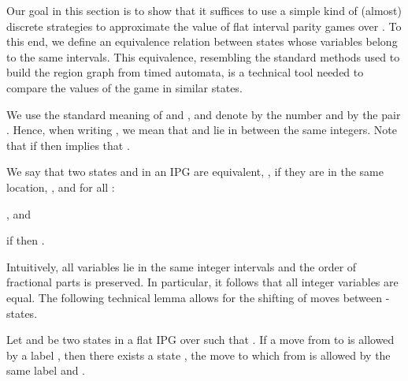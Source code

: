 \documentclass[fleqn,envcountsame]{LMCS}
\begin{document}
Our goal in this section is to show that it suffices to use a simple kind
of (almost) discrete strategies to approximate the value of flat 
interval parity games over .
To this end, we define an equivalence relation between states
whose variables belong to the same  intervals. This equivalence,
resembling the standard methods used to build the region graph from
timed automata, is a technical tool needed to compare the values of
the game in similar states. 

We use the standard meaning
of  and , and denote by  the number 
and by  the pair . Hence, when writing
, we mean that  and  lie in between the same integers.
Note that if  then  implies that .

\begin{defi}
We say that two states  and  in an IPG are equivalent, ,
if they are in the same location, , and for all
:
\begin{iteMize}{}
\item , and
\item if  then .
\end{iteMize}
\end{defi}

Intuitively, all variables lie in the same integer intervals and the order
of fractional parts is preserved. In particular, it follows that all
integer variables are equal.
The following technical lemma allows for the shifting of moves between -states.

\begin{lem} \label{shift-move}
Let  and  be two states in a flat IPG over  such that .
If a move from  to  is allowed by a label ,
then there exists a state , the move to which from  is allowed by
the same label  and .
\end{lem}
\end{document}
